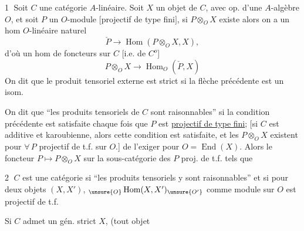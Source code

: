 
\textcircled{1} Soit $C$ une catégorie $A$-linéaire. Soit $X$ un objet de $C$, avec op. d'une $A$-algèbre $O$, et soit $P$ un $O$-module  $[$projectif de type fini$]$, si $P\otimes_O X$ existe alors on a un hom  $O$-linéaire  naturel
\[
\check P\longrightarrow\operatorname{Hom}(P\otimes_O X,X),
\]
d'où un hom de  foncteurs  sur $C$ $[$i.e. de $C^o$]
\[
P\otimes_O X\longrightarrow\operatorname{Hom}_O(\check P,X)
\]
On dit que le produit tensoriel externe  est strict si la flèche précédente est un isom.

On dit que  ``les produits tensoriels  de $C$ sont raisonnables'' si la condition précédente est satisfaite chaque fois que $P$ est \uline{projectif de type fini};
$[$si $C$ est additive et karoubienne, 
alors cette condition est satisfaite, et les $P\otimes_O X$ existent pour $\forall\,P$ projectif de t.f. sur $O.$]
 de l'exiger pour $O=\operatorname{End}(X)$.
Alors le foncteur $P\longmapsto P\otimes_O X$ sur la sous-catégorie des $P$ proj. de t.f. tels que

\textcircled{2} $C$ est une catégorie
   si
``les produits tensoriels y sont raisonnables'' et si pour deux objets $(X,X')$,
$ {}_{\unsure{O}}\operatorname{Hom}(X,X')_{\unsure{O'}}$ comme module sur $O$  est projectif de t.f.

Si $C$ admet un gén. strict $X$, (tout objet
